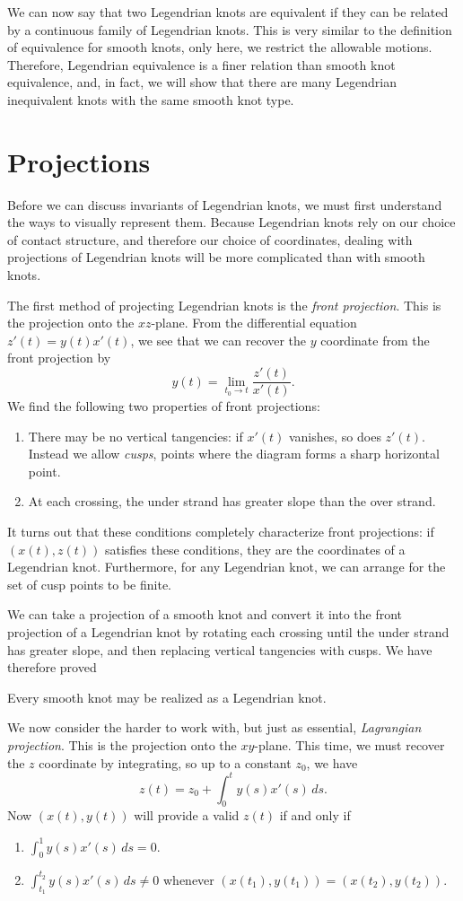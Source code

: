 \documentclass{article}
\begin{document}
We can now say that two Legendrian knots are equivalent if they can be related by a continuous
family of Legendrian knots. This is very similar to the definition of equivalence
for smooth knots, only here, we restrict the allowable motions.
Therefore, Legendrian equivalence is a finer relation than smooth knot equivalence,
and, in fact, we will show that there are many Legendrian inequivalent knots
with the same smooth knot type.

\section{Projections}
Before we can discuss invariants of Legendrian knots, we must first understand
the ways to visually represent them.
Because Legendrian knots rely on our choice of contact structure, and therefore
our choice of coordinates, dealing with projections of Legendrian knots will
be more complicated than with smooth knots.

The first method of projecting Legendrian knots is the {\it front projection}.
This is the projection onto the $xz$-plane. From the differential equation
$z'(t) = y(t)x'(t)$, we see that we can recover the $y$ coordinate from the front
projection by
\[y(t) = \lim_{t_0\to t}\frac{z'(t)}{x'(t)}.\]
We find the following two properties of front projections:
\begin{enumerate}[label=\roman*)]
\item There may be no vertical tangencies: if $x'(t)$ vanishes, so does $z'(t)$. Instead we 
allow {\it cusps}, points where the diagram forms a sharp horizontal point.
\item At each crossing, the under strand has greater slope than the over strand.
\end{enumerate}
It turns out that these conditions completely characterize front projections:
if $(x(t),z(t))$ satisfies these conditions, they are the coordinates of a Legendrian knot.
Furthermore, for any Legendrian knot, we can arrange for the set of cusp points to be finite.

We can take a projection of a smooth knot and convert it into the front
projection of a Legendrian knot by rotating each crossing until the under
strand has greater slope, and then
replacing vertical tangencies with cusps. We have therefore proved
\begin{theorem}
Every smooth knot may be realized as a Legendrian knot.
\end{theorem}

We now consider the harder to work with, but just as essential, {\it Lagrangian projection}.
This is the projection onto the $xy$-plane. This time, we must recover the $z$ coordinate
by integrating, so up to a constant $z_0$, we have
\[ z(t) = z_0 + \int_0^t y(s)x'(s)\,ds.\]
Now $(x(t),y(t))$ will provide a valid $z(t)$ if and only if
\begin{enumerate}[label=\roman*)]
\item $\int_0^1 y(s)x'(s)\,ds = 0$.
\item $\int_{t_1}^{t_2} y(s)x'(s)\,ds \neq 0$ whenever $(x(t_1),y(t_1))=(x(t_2),y(t_2))$.
\end{enumerate}
\end{document}

